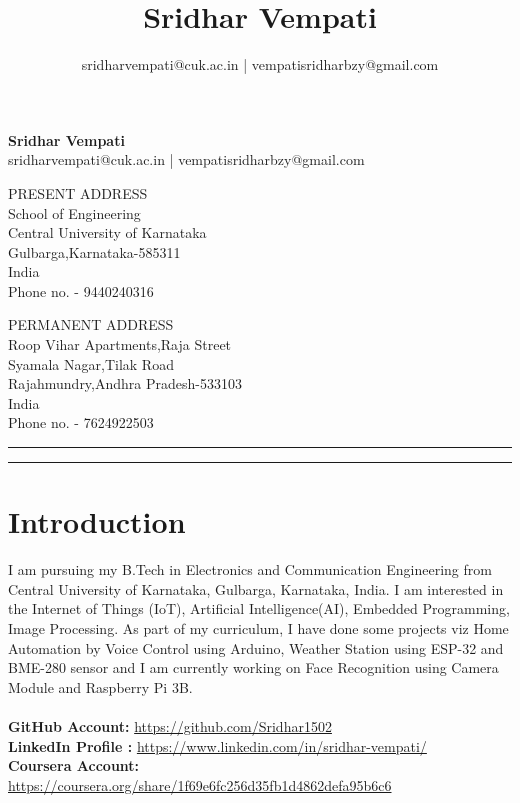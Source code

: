 \documentclass[]{article}
\title{Sridhar Vempati}
\author{sridharvempati@cuk.ac.in | vempatisridharbzy@gmail.com}
\begin{document}
    \begin{center}
        \Huge \textbf{Sridhar Vempati}\\
        \large sridharvempati@cuk.ac.in | vempatisridharbzy@gmail.com\\ 
    \end{center}
    \begin{multicols}{2}[]
        \begin{flushleft}
            PRESENT ADDRESS\\School of Engineering\\Central University of Karnataka\\Gulbarga,Karnataka-585311\\India\\Phone no. - 9440240316
        \end{flushleft}
        \begin{flushright}
            PERMANENT ADDRESS\\Roop Vihar Apartments,Raja Street\\Syamala Nagar,Tilak Road\\Rajahmundry,Andhra Pradesh-533103\\India\\Phone no. - 7624922503
        \end{flushright}
    \end{multicols}  
    \begin{spacing}{0.05} %
    \noindent
    \rule{\linewidth}{2pt}
    \rule{\linewidth}{1pt}  
    \end{spacing}
    \section*{Introduction}
    I am pursuing my B.Tech in Electronics and Communication Engineering from Central University of Karnataka, Gulbarga, Karnataka, India.
    I am interested in the Internet of Things (IoT), Artificial Intelligence(AI), Embedded Programming, Image Processing.
    As part of my curriculum, I have done some projects viz Home Automation by Voice Control using Arduino, Weather Station using ESP-32 and BME-280 sensor and I am currently working on Face Recognition using Camera Module and Raspberry Pi 3B.\\
    \\ \textbf{GitHub Account:} \url{https://github.com/Sridhar1502}
    \\ \textbf{LinkedIn Profile :} \url{https://www.linkedin.com/in/sridhar-vempati/}
    \\ \textbf{Coursera Account: } \url{https://coursera.org/share/1f69e6fc256d35fb1d4862defa95b6c6}
\end{document}
